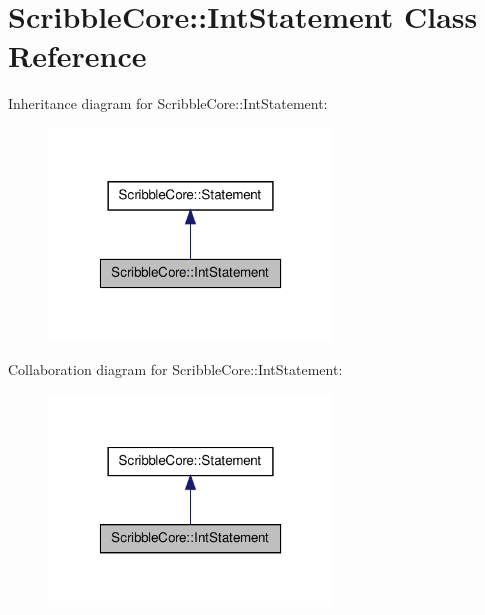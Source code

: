 \hypertarget{class_scribble_core_1_1_int_statement}{\section{Scribble\-Core\-:\-:Int\-Statement Class Reference}
\label{class_scribble_core_1_1_int_statement}
}


Inheritance diagram for Scribble\-Core\-:\-:Int\-Statement\-:\nopagebreak
\begin{figure}[H]
\begin{center}
\leavevmode
\includegraphics[width=214pt]{class_scribble_core_1_1_int_statement__inherit__graph}
\end{center}
\end{figure}


Collaboration diagram for Scribble\-Core\-:\-:Int\-Statement\-:\nopagebreak
\begin{figure}[H]
\begin{center}
\leavevmode
\includegraphics[width=214pt]{class_scribble_core_1_1_int_statement__coll__graph}
\end{center}
\end{figure}
